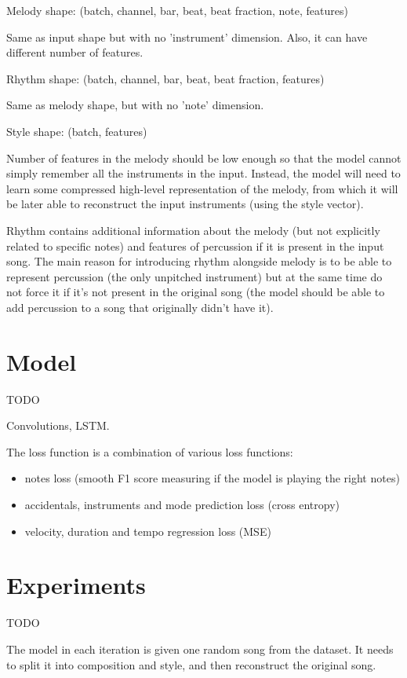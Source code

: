 \documentclass[en]{pracamgr}
\begin{document}
Melody shape: (batch, channel, bar, beat, beat fraction, note, features)

Same as input shape but with no 'instrument' dimension.
Also, it can have different number of features.

Rhythm shape: (batch, channel, bar, beat, beat fraction, features)

Same as melody shape, but with no 'note' dimension.

Style shape: (batch, features)

Number of features in the melody should be low enough so that the model cannot simply remember all the instruments in the input.
Instead, the model will need to learn some compressed high-level representation of the melody, from which it will be later able to reconstruct the input instruments (using the style vector).

Rhythm contains additional information about the melody (but not explicitly related to specific notes) and features of percussion if it is present in the input song.
The main reason for introducing rhythm alongside melody is to be able to represent percussion (the only unpitched instrument) but at the same time do not force it if it's not present in the original song (the model should be able to add percussion to a song that originally didn't have it).

\chapter{Model}

TODO

Convolutions, LSTM.

The loss function is a combination of various loss functions:
\begin{itemize}
\item notes loss (smooth F1 score measuring if the model is playing the right notes)
\item accidentals, instruments and mode prediction loss (cross entropy)
\item velocity, duration and tempo regression loss (MSE)
\end{itemize}

\chapter{Experiments}

TODO

The model in each iteration is given one random song from the dataset.
It needs to split it into composition and style, and then reconstruct the original song.
\end{document}
